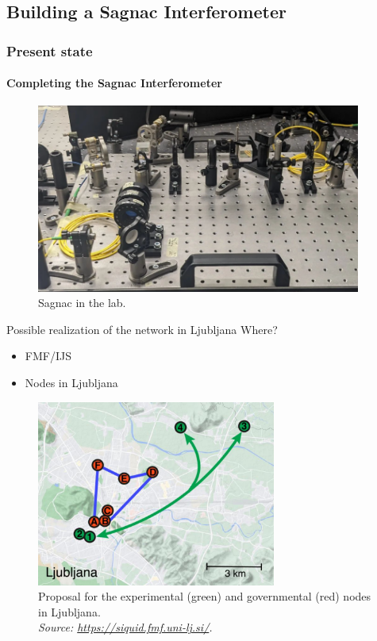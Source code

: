 \documentclass[serif,8pt]{beamer}
\begin{document}
\subsection{Building a Sagnac Interferometer}
\begin{frame}[t]
	\frametitle{Present state}
	\framesubtitle{Completing the Sagnac Interferometer}
	\begin{figure}
		\begin{center}
			\includegraphics[width=0.95\textwidth]{SagnacLab.png}
		\end{center}
		\caption{Sagnac in the lab.}
	\end{figure}
\end{frame}


\begin{frame}[t]{Possible realization of the network in Ljubljana}
	Where?
	\begin{itemize}
		\begin{itemize}
			\item FMF/IJS
			\item Nodes in Ljubljana %
		\end{itemize}	
	\end{itemize}
	\begin{figure}
		\begin{center}
			\includegraphics[width=0.7\textwidth]{Ljubljana_Nodes.png}
		\end{center}
		\centering
		\caption{Proposal for the experimental (green)
		and governmental (red) nodes in Ljubljana.\\\textit{Source: \url{https://siquid.fmf.uni-lj.si/}.}}
		\label{fig:LjubNode}
	\end{figure}
\end{frame}
\end{document}
